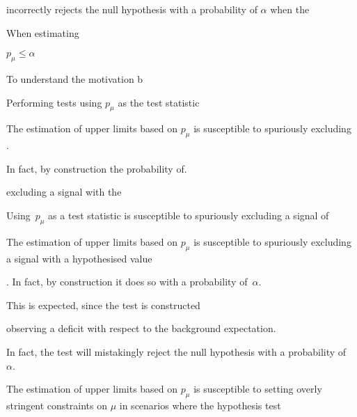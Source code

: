 incorrectly
rejects the null hypothesis with a probability of $\alpha$ when the



When estimating



$p_\mu \leq \alpha$

To understand the motivation b

Performing tests using $p_\mu$ as the test statistic


The estimation of upper limits based on $p_\mu$ is susceptible to spuriously
excluding .


In fact, by construction the probability of.




excluding a signal with the


Using~$p_\mu$ as a test statistic is susceptible to
spuriously excluding a signal of



The estimation of upper limits based on $p_\mu$ is susceptible to spuriously
excluding a signal with a hypothesised value


. In fact, by construction it does
so with a probability of~$\alpha$.






This is expected, since the test is constructed







observing a deficit with respect to the background expectation.



In fact, the test
will mistakingly reject the null hypothesis with a probability of~$\alpha$.





The estimation of upper limits based on $p_\mu$ is
susceptible to setting overly stringent constraints on $\mu$ in scenarios where
the hypothesis test












